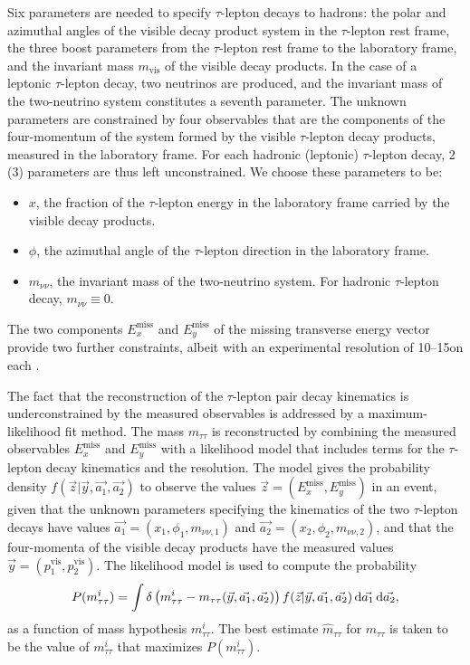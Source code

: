 \documentclass[12pt,twoside,a4paper,cmspaper,final,collab]{cms-tdr}
\begin{document}
Six parameters are needed to specify $\tau$-lepton decays to hadrons:
the polar and azimuthal angles of the visible decay product system in the $\tau$-lepton rest frame, the three boost parameters from the $\tau$-lepton rest frame to the laboratory frame, and the invariant mass $m_\text{vis}$ of the visible decay products.
In the case of a leptonic $\tau$-lepton decay, two neutrinos are produced,
and the invariant mass of the two-neutrino system constitutes a seventh parameter.
The unknown parameters are constrained by four observables that are the components of the four-momentum
of the system formed by the visible $\tau$-lepton decay products, measured in the laboratory frame.
For each hadronic (leptonic) $\tau$-lepton decay, 2 (3) parameters are thus left unconstrained.
We choose these parameters to be:
\begin{itemize}
\item $x$, the fraction of the $\tau$-lepton energy in the laboratory frame carried by the visible decay products.
\item $\phi$, the azimuthal angle of the $\tau$-lepton direction in the laboratory frame.
\item $m_{\nu\nu}$, the invariant mass of the two-neutrino system. For hadronic $\tau$-lepton decay, $m_{\nu\nu} \equiv 0$.
\end{itemize}
The two components $E_{x}^\text{miss}$ and $E_{y}^\text{miss}$ of the missing transverse energy vector provide two further constraints,
albeit with an experimental resolution of 10--15\GeV on each \cite{PFMEtSignAlgo}.

The fact that the reconstruction of the $\tau$-lepton pair decay kinematics is underconstrained by the measured observables
is addressed by a maximum-likelihood fit method.
The mass $m_{\tau\tau}$ is reconstructed by combining the measured observables $E_{x}^\text{miss}$ and $E_{y}^\text{miss}$ with a likelihood  model
that includes terms for the $\tau$-lepton decay kinematics and the \MET resolution.
The model gives the probability density $f(\vec{z} \vert \vec{y}, \vec{a_1}, \vec{a_2})$
to observe the values $\vec{z} = (E_{x}^\text{miss}, E_{y}^\text{miss})$ in an event,
given that the unknown parameters specifying the kinematics of the two $\tau$-lepton decays have values
$\vec{a_1} = (x_{1}, \phi_{1}, m_{\nu\nu,1})$ and $\vec{a_2} = (x_{2}, \phi_{2}, m_{\nu\nu,2})$,
and that the four-momenta of the visible decay products have the measured values $\vec{y} = (p^\text{vis}_{1}, p^\text{vis}_{2})$.
The likelihood model is used to compute the probability
\begin{equation}
P(m_{\tau\tau}^{i}) = \int \delta \left( m_{\tau\tau}^{i} - m_{\tau\tau}(\vec{y}, \vec{a_1}, \vec{a_2}) \right) f(\vec{z} \vert \vec{y}, \vec{a_1}, \vec{a_2})\, \mathrm{d}\vec{a_1}\,\mathrm{d}\vec{a_2},
\label{eq:mtautau}
\end{equation}
as a function of mass hypothesis $m_{\tau\tau}^{i}$.
The best estimate $\hat{m}_{\tau\tau}$ for $m_{\tau\tau}$ is taken to be the value of $m_{\tau\tau}^{i}$ that maximizes $P(m_{\tau\tau}^{i})$.
\end{document}
